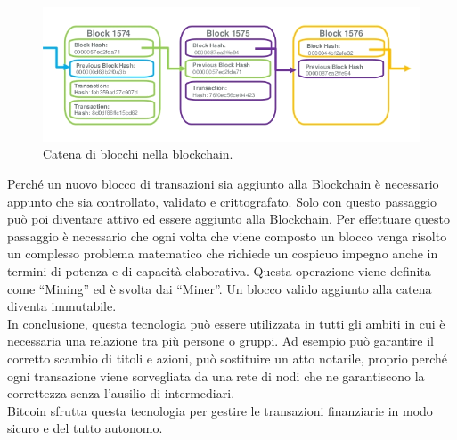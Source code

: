 \begin{figure}[H]
	\centering
	\includegraphics[width=\textwidth]{images/blockChain.png}
	\caption{Catena di blocchi nella blockchain.}
	\label{fig:blockChain}
\end{figure}

Perché un nuovo blocco di transazioni sia aggiunto alla Blockchain è necessario appunto che sia controllato, validato e crittografato. Solo con questo passaggio può poi diventare attivo ed essere aggiunto alla Blockchain. Per effettuare questo passaggio è necessario che ogni volta che viene composto un blocco venga risolto un complesso problema matematico che richiede un cospicuo impegno anche in termini di potenza e di capacità elaborativa. Questa operazione viene definita come “Mining” ed è svolta dai “Miner”. Un blocco valido aggiunto alla catena diventa immutabile.
\\In conclusione, questa tecnologia può essere utilizzata in tutti gli ambiti in cui è necessaria una relazione tra più persone o gruppi. Ad esempio può garantire il corretto scambio di titoli e azioni, può sostituire un atto notarile, proprio perché ogni transazione viene sorvegliata da una rete di nodi che ne garantiscono la correttezza senza l’ausilio di intermediari.
\\Bitcoin sfrutta questa tecnologia per gestire le transazioni finanziarie in modo sicuro e del tutto autonomo.
